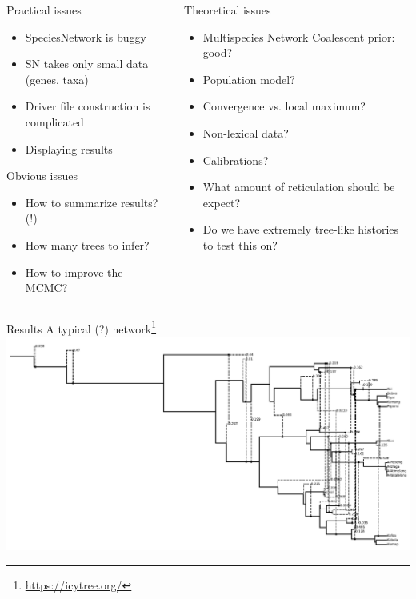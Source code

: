 \documentclass[
10pt,
]{beamer}
\begin{document}
\begin{frame}{}
  \begin{columns}
    \begin{column}{0.5\textwidth}
      \pause
      Practical issues
      \begin{itemize}
      \item SpeciesNetwork is buggy
        \pause
      \item SN takes only small data (genes, taxa)
        \pause
      \item Driver file construction is complicated
        \pause
      \item Displaying results
      \end{itemize}
      \pause
      Obvious issues
      \begin{itemize}
      \item How to summarize results? (!)
      \item How many trees to infer?
      \item How to improve the MCMC?
      \end{itemize}
    \end{column}
    \begin{column}{0.5\textwidth}
      \pause
      Theoretical issues
      \begin{itemize}
      \item Multispecies Network Coalescent prior: good?
      \item Population model?
      \item Convergence vs. local maximum?
      \item Non-lexical data?
      \item Calibrations?
      \item What amount of reticulation should be expect?
      \item Do we have extremely tree-like histories to test this on?
      \end{itemize}
    \end{column}
  \end{columns}
\end{frame}
\begin{frame}{Results}
  A typical (?) network\footnote{\url{https://icytree.org/}}
  \includegraphics[width=\textwidth]{tree}
\end{frame}
\end{document}
